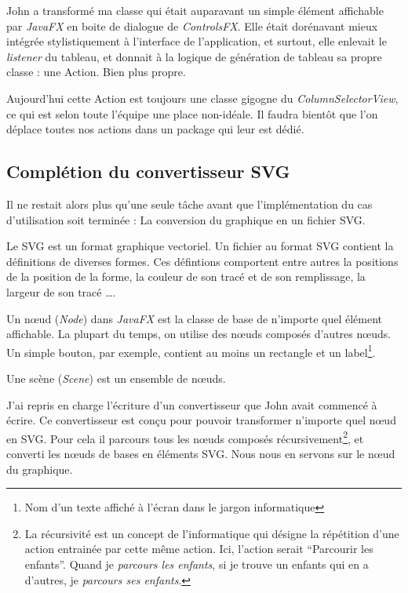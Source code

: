 John a transformé ma classe qui était auparavant un simple élément affichable par \textit{JavaFX} en boite de dialogue de \textit{ControlsFX}. Elle était dorénavant mieux intégrée stylistiquement à l'interface de l'application, et surtout, elle enlevait le \textit{listener} du tableau, et donnait à la logique de génération de tableau sa propre classe : une Action. Bien plus propre.

Aujourd'hui cette Action est toujours une classe gigogne du \textit{ColumnSelectorView}, ce qui est selon toute l'équipe une place non-idéale. Il faudra bientôt que l'on déplace toutes nos actions dans un package qui leur est dédié.

%
%
\subsection{Complétion du convertisseur SVG}
Il ne restait alors plus qu'une seule tâche avant que l'implémentation du cas d'utilisation soit terminée : La conversion du graphique en un fichier SVG.

\begin{center}
Le SVG est un format graphique vectoriel. Un fichier au format SVG contient la définitions de diverses formes. Ces défintions comportent entre autres la positions de la position de la forme, la couleur de son tracé et de son remplissage, la largeur de son tracé \ldots.
\end{center}

\begin{center}
Un nœud (\textit{Node}) dans \textit{JavaFX} est la classe de base de n'importe quel élément affichable. La plupart du temps, on utilise des nœuds composés d'autres nœuds. Un simple bouton, par exemple, contient au moins un rectangle et un label\footnote{Nom d'un texte affiché à l'écran dans le jargon informatique}.
\end{center}

\begin{center}
Une scène (\textit{Scene}) est un ensemble de nœuds.
\end{center}

J'ai repris en charge l'écriture d'un convertisseur que John avait commencé à écrire. Ce convertisseur est conçu pour pouvoir transformer n'importe quel nœud en SVG. Pour cela il parcours tous les nœuds composés récursivement\footnote{La récursivité est un concept de l'informatique qui désigne la répétition d'une action entrainée par cette même action. Ici, l'action serait ``Parcourir les enfants''. Quand je \emph{parcours les enfants}, si je trouve un enfants qui en a d'autres, je \emph{parcours ses enfants}.}, et converti les nœuds de bases en éléments SVG. Nous nous en servons sur le nœud du graphique.

